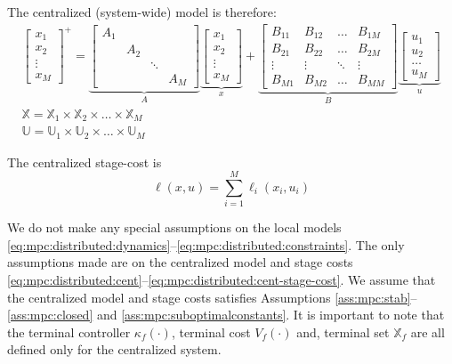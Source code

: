 The centralized (system-wide) model is therefore:
\begin{gather}
\label{eq:mpc:distributed:cent}
\begin{bmatrix}x_1\\x_2\\\vdots\\x_M\end{bmatrix}^+
= \underbrace{\begin{bmatrix}A_1 & & & \\ & A_2 & & \\ & & \ddots& \\
    & & & A_M \end{bmatrix}}_{A}
\underbrace{\begin{bmatrix}x_1\\x_2\\\vdots\\x_M\end{bmatrix}}_{x}+
\underbrace{\begin{bmatrix}B_{11}&B_{12}&\ldots&B_{1M}\\
B_{21}&B_{22}&\ldots&B_{2M}\\ 
\vdots& \vdots& \ddots& \vdots\\
B_{M1}&B_{M2}& \ldots&B_{MM} \end{bmatrix}}_{B}
\underbrace{\begin{bmatrix}u_1\\u_2\\\ldots\\u_M\end{bmatrix}}_{u} \\
\mathbb{X} = \mathbb{X}_1 \times \mathbb{X}_2 \times \ldots \times
\mathbb{X}_M \\
\mathbb{U} = \mathbb{U}_1 \times \mathbb{U}_2 \times \ldots \times
\mathbb{U}_M
\end{gather}

The centralized stage-cost is 
\begin{equation}
\label{eq:mpc:distributed:cent-stage-cost}
\ell(x,u) = \sum_{i=1}^{M} \ell_i(x_i,u_i)
\end{equation}

We do not make any special assumptions on the local models
\eqref{eq:mpc:distributed:dynamics}--\eqref{eq:mpc:distributed:constraints}. The
only assumptions made are on the centralized model and stage costs
\eqref{eq:mpc:distributed:cent}--\eqref{eq:mpc:distributed:cent-stage-cost}. We
assume that the centralized model and stage costs satisfies Assumptions
\ref{ass:mpc:stab}--\ref{ass:mpc:closed} and \ref{ass:mpc:suboptimalconstants}. It is important to note that
the terminal controller $\kappa_f(\cdot)$, terminal cost $V_f(\cdot)$
and, terminal set $\mathbb{X}_f$ are all defined only for the
centralized system. 


